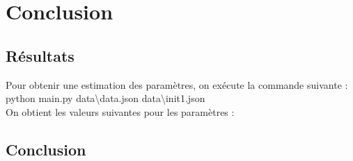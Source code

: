 \section{Conclusion}
\subsection{Résultats}
Pour obtenir une estimation des paramètres, on exécute la commande suivante :  \\
python main.py data\textbackslash data.json data\textbackslash init1.json \\
On obtient les valeurs suivantes pour les paramètres : 


\subsection{Conclusion}

